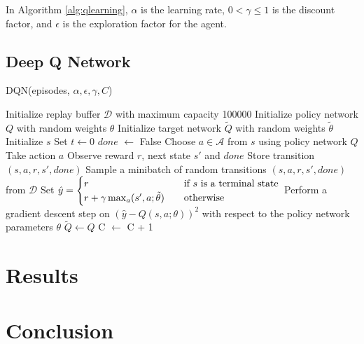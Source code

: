 \documentclass{article}
\begin{document}
In Algorithm \ref{alg:qlearning}, \(\alpha\) is the learning rate, \(0 < \gamma
\leq 1\) is the discount factor, and \(\epsilon\) is the exploration factor for
the agent.

\subsection{Deep Q Network}

\begin{algorithm}
      \caption{DQN(episodes, \(\alpha, \epsilon, \gamma, C\))}
      \label{alg:dqn}
      \begin{algorithmic}[1]
            \State Initialize replay buffer \(\mathcal{D}\) with maximum capacity 100000
            \State Initialize policy network \(Q\) with random weights \(\theta\)
            \State Initialize target network \(\tilde{Q}\) with random weights \(\tilde{\theta}\) 
            \State Initialize \(s\)
            \State Set \(t \leftarrow 0\) 
            \State \(done\) \(\leftarrow\) False
            \State Choose \(a \in \mathcal{A}\) from \(s\) using policy network \(Q\) 
            \State Take action \(a\)
            \State Observe reward \(r\), next state \(s'\) and \(done\)
            \State Store transition \((s, a, r, s', done)\)
            \State Sample a minibatch of random transitions \((s, a, r, s', done)\) from \(\mathcal{D}\)
            \State Set \(\hat{y} =
            \begin{cases}
                  r                                                  & \quad \text{if }s \text{ is a terminal state} \\
                  r + \gamma \max_a \title{Q}(s', a; \tilde{\theta}) & \quad \text{otherwise}
            \end{cases}\)
            \State Perform a gradient descent step on \(\left(\hat{y} - Q(s, a; \theta)\right)^2\) with respect to the policy network parameters \(\theta\)
            \State \(\tilde{Q} \leftarrow Q\) 
            \EndIf
            \State C \(\leftarrow\) C + 1
            \EndWhile
            \EndFor
      \end{algorithmic}
\end{algorithm}

\section{Results}



\section{Conclusion}

\newpage
\nocite{*}


\end{document}
